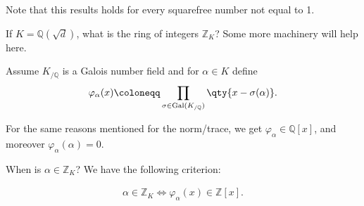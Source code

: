 Note that this results holds for every squarefree number not equal to 1.

\begin{question}

If \(K = {\mathbb{Q}}( \sqrt{d} )\), what is the ring of integers
\({\mathbb{Z}}_K\)? Some more machinery will help here.

\end{question}

\begin{definition}

Assume \(K_{/{\mathbb{Q}}}\) is a Galois number field and for
\(\alpha\in K\) define
\begin{align*}
\varphi_{\alpha}(x) \coloneqq\prod_{ \sigma\in \operatorname{Gal}(K_{/{\mathbb{Q}}})} \qty{ x - \sigma(\alpha)}
.\end{align*}

\end{definition}

\begin{remark}

For the same reasons mentioned for the norm/trace, we get
\(\varphi_{\alpha} \in {\mathbb{Q}}[x]\), and moreover
\(\varphi_{ \alpha } (\alpha) = 0\).

\end{remark}

When is \(\alpha\in {\mathbb{Z}}_K\)? We have the following criterion:

\begin{proposition}[?]

\begin{align*}
\alpha\in {\mathbb{Z}}_K \iff \varphi_{ \alpha } (x) \in {\mathbb{Z}}[x]
.\end{align*}

\end{proposition}

